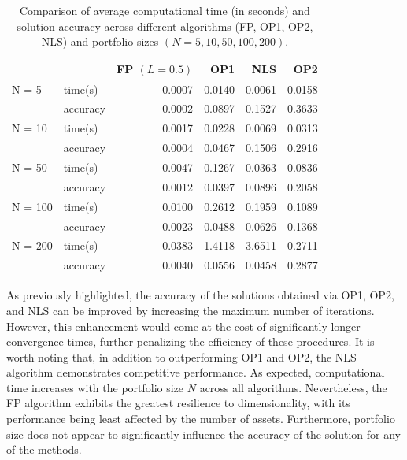 \documentclass[preprint,11pt,authoryear]{elsarticle}
\begin{document}
\begin{table}[!h]
  \centering
  \caption{Comparison of average computational time (in seconds) and solution accuracy across different algorithms (FP, OP1, OP2, NLS) and portfolio sizes $(N = 5, 10, 50, 100, 200)$.}
    \begin{tabular}{|r|l|r|r|r|r|}
		\hline
          &       & FP $(L = 0.5)$ & OP1 & NLS & OP2 \\
					\hline
					\hline
    \multicolumn{1}{l}{N = 5} & time(s)  & 0.0007 & 0.0140 & 0.0061 & 0.0158 \\
          & accuracy & 0.0002 & 0.0897 & 0.1527 & 0.3633 \\
					\hline
    \multicolumn{1}{l}{N = 10} & time(s)  & 0.0017 & 0.0228 & 0.0069 & 0.0313 \\
          & accuracy & 0.0004 & 0.0467 & 0.1506 & 0.2916 \\
					\hline
    \multicolumn{1}{l}{N = 50} & time(s)  & 0.0047 & 0.1267 & 0.0363 & 0.0836 \\
          & accuracy & 0.0012 & 0.0397 & 0.0896 & 0.2058 \\
					\hline
    \multicolumn{1}{l}{N = 100} & time(s)  & 0.0100 & 0.2612 & 0.1959 & 0.1089 \\
          & accuracy & 0.0023 & 0.0488 & 0.0626 & 0.1368 \\
					\hline
    \multicolumn{1}{l}{N = 200} & time(s)  & 0.0383 & 1.4118 & 3.6511 & 0.2711 \\
          & accuracy & 0.0040 & 0.0556 & 0.0458 & 0.2877 \\
					\hline
    \end{tabular}%
  \label{tab1}%
\end{table}%

As previously highlighted, the accuracy of the solutions obtained via OP1, OP2, and NLS can be improved by increasing the maximum number of iterations. However, this enhancement would come at the cost of significantly longer convergence times, further penalizing the efficiency of these procedures. It is worth noting that, in addition to outperforming OP1 and OP2, the NLS algorithm demonstrates competitive performance. As expected, computational time increases with the portfolio size $N$ across all algorithms. Nevertheless, the FP algorithm exhibits the greatest resilience to dimensionality, with its performance being least affected by the number of assets. Furthermore, portfolio size does not appear to significantly influence the accuracy of the solution for any of the methods.
\end{document}
